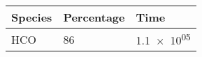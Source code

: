 \begin{tabular}{lll}
\toprule
Species & Percentage &           Time \\
\midrule
    HCO &         86 &  \num{1.1e+05} \\
\bottomrule
\end{tabular}
